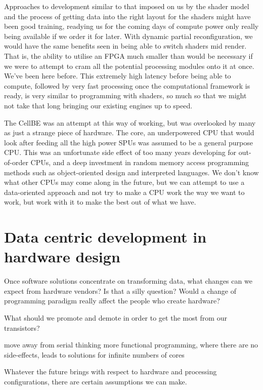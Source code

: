 Approaches to development similar to that imposed on us by the shader model and
the process of getting data into the right layout for the shaders might have
been good training, readying us for the coming days of compute power only
really being available if we order it for later. With dynamic partial
reconfiguration, we would have the same benefits seen in being able to switch
shaders mid render. That is, the ability to utilise an FPGA much smaller than
would be necessary if we were to attempt to cram all the potential processing
modules onto it at once. We've been here before. This extremely high latency
before being able to compute, followed by very fast processing once the
computational framework is ready, is very similar to programming with shaders,
so much so that we might not take that long bringing our existing engines up to
speed.

The CellBE was an attempt at this way of working, but was overlooked by many as
just a strange piece of hardware. The core, an underpowered CPU that would look
after feeding all the high power SPUs was assumed to be a general purpose CPU.
This was an unfortunate side effect of too many years developing for
out-of-order CPUs, and a deep investment in random memory access programming
methods such as object-oriented design and interpreted languages. We don't
know what other CPUs may come along in the future, but we can attempt to use a
data-oriented approach and not try to make a CPU work the way we want to work,
but work with it to make the best out of what we have.

\section{Data centric development in hardware design}

Once software solutions concentrate on transforming data, what changes can we
expect from hardware vendors? Is that a silly question? Would a change of
programming paradigm really affect the people who create hardware?

What should we promote and demote in order to get the most
from our transistors?

move away from serial thinking
more functional programming, where there are no side-effects, leads to
solutions for infinite numbers of cores

Whatever the future brings with respect to hardware and processing
configurations, there are certain assumptions we can make. 
